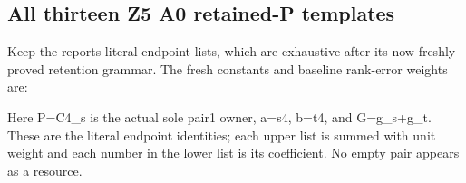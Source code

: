 \documentclass[10pt,a4paper]{article}
\theoremstyle{definition}
\begin{document}
\hypertarget{all-thirteen-z5-a0-retained-p-templates}{%
\subsection{All thirteen Z5 A0 retained-P
templates}\label{all-thirteen-z5-a0-retained-p-templates}}

Keep the report\textquotesingle s literal endpoint lists,\allowbreak{} which are
exhaustive after its now freshly proved retention grammar. The fresh
constants and baseline rank-error weights are:

Here P=\allowbreak{}C4\_\allowbreak{}s is the actual sole pair1 owner,\allowbreak{} a=\allowbreak{}s4,\allowbreak{} b=\allowbreak{}t4,\allowbreak{} and
G=\allowbreak{}g\_\allowbreak{}s+\allowbreak{}g\_\allowbreak{}t. These are the literal endpoint identities; each upper list
is summed with unit weight and each number in the lower list is its
coefficient. No empty pair appears as a resource.
\end{document}
